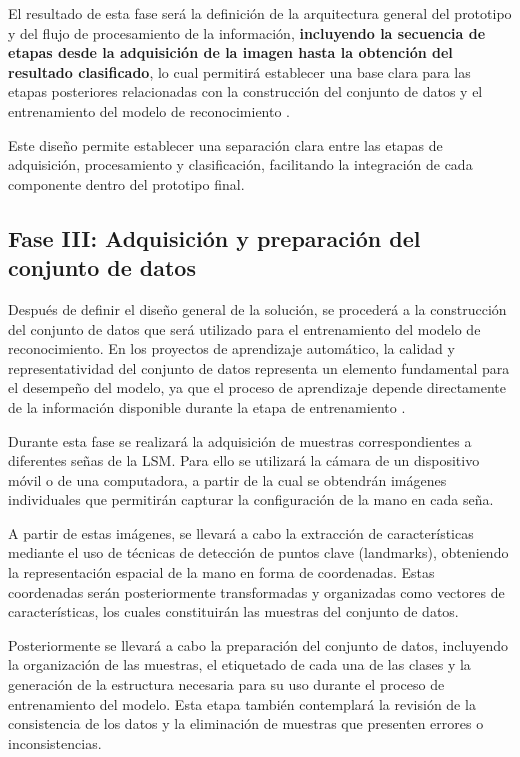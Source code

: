 	El resultado de esta fase será la definición de la arquitectura general del
	prototipo y del flujo de procesamiento de la información, \textbf{incluyendo la secuencia de etapas desde la adquisición de la imagen hasta la obtención del resultado clasificado}, lo cual permitirá
	establecer una base clara para las etapas posteriores relacionadas con la
	construcción del conjunto de datos y el entrenamiento del modelo de
	reconocimiento \cite{mall2018,jalote2005}.
	
	Este diseño permite establecer una separación clara entre las etapas de adquisición, procesamiento y clasificación, facilitando la integración de cada componente dentro del prototipo final.
	
	\subsection{Fase III: Adquisición y preparación del conjunto de datos}
	
	Después de definir el diseño general de la solución, se procederá a la
	construcción del conjunto de datos que será utilizado para el entrenamiento
	del modelo de reconocimiento. En los proyectos de aprendizaje automático,
	la calidad y representatividad del conjunto de datos representa un elemento
	fundamental para el desempeño del modelo, ya que el proceso de aprendizaje
	depende directamente de la información disponible durante la etapa de
	entrenamiento \cite{goodfellow2016,geron2019}.
	
	Durante esta fase se realizará la adquisición de muestras correspondientes a
	diferentes señas de la LSM. Para ello se utilizará la
	cámara de un dispositivo móvil o de una computadora, a partir de la cual se
	obtendrán imágenes individuales que permitirán capturar la configuración de la
	mano en cada seña.
	
	A partir de estas imágenes, se llevará a cabo la extracción de características
	mediante el uso de técnicas de detección de puntos clave (landmarks), obteniendo
	la representación espacial de la mano en forma de coordenadas. Estas
	coordenadas serán posteriormente transformadas y organizadas como vectores de
	características, los cuales constituirán las muestras del conjunto de datos.
	
	Posteriormente se llevará a cabo la preparación del conjunto de datos,
	incluyendo la organización de las muestras, el etiquetado de cada una de las
	clases y la generación de la estructura necesaria para su uso durante el
	proceso de entrenamiento del modelo. Esta etapa también contemplará la
	revisión de la consistencia de los datos y la eliminación de muestras que
	presenten errores o inconsistencias.
	
